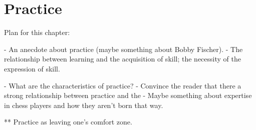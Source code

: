 \chapter*{Practice}

Plan for this chapter:

- An anecdote about practice (maybe something about Bobby Fischer).
- The relationship between learning and the acquisition of skill; the necessity
of the expression of skill.


- What are the characteristics of practice?
- Convince the reader that there a strong relationship between practice and the 
- Maybe something about expertise in chess players and how they aren't born that
way.

** Practice as leaving one's comfort zone.
